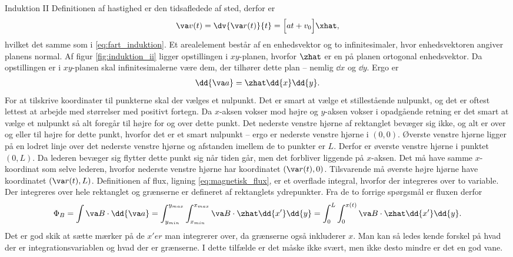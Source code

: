 \begin{opgave}{Induktion II}
    \opg Definitionen af hastighed er den tidsafledede af sted, derfor er
    \begin{align}
        \va v(t) = \dv{\va r(t)}{t} = \Big[at+v_0\Big]\xhat,
    \end{align}
    hvilket det samme som i \eqref{eq:fart_induktion}.
    \opg Et arealelement består af en enhedsvektor og to infinitesimaler, hvor enhedsvektoren angiver planens normal. Af figur \ref{fig:induktion_ii} ligger opstillingen i $xy$-planen, hvorfor $\zhat$ er en på planen ortogonal enhedsvektor. Da opstillingen er i $xy$-planen skal infinitesimalerne være dem, der tilhører dette plan -- nemlig $\dd x$ og $\dd y$. Ergo er
    \begin{align}
        \dd{\va a} = \zhat \dd{x}\dd{y}.
    \end{align}
    \opg For at tilskrive koordinater til punkterne skal der vælges et nulpunkt. Det er smart at vælge et stillestående nulpunkt, og det er oftest lettest at arbejde med størrelser med positivt fortegn. Da $x$-aksen vokser mod højre og $y$-aksen vokser i opadgående retning er det smart at vælge et nulpunkt så alt foregår til højre for og over dette punkt. Det nederste venstre hjørne af rektanglet bevæger sig ikke, og alt er over og eller til højre for dette punkt, hvorfor det er et smart nulpunkt -- ergo er nederste venstre hjørne i $(0,0)$. Øverste venstre hjørne ligger på en lodret linje over det nederste venstre hjørne og afstanden imellem de to punkter er $L$. Derfor er øverste venstre hjørne i punktet $(0,L)$. Da lederen bevæger sig flytter dette punkt sig når tiden går, men det forbliver liggende på $x$-aksen. Det må have samme $x$-koordinat som selve lederen, hvorfor nederste venstre hjørne har koordinatet $\left(\va r(t),0\right)$. Tilsvarende må øverste højre hjørne have koordinatet $\left(\va r(t),L\right)$.
    \opg Definitionen af flux, ligning \eqref{eq:magnetisk_flux}, er et overflade integral, hvorfor der integreres over to variable. Der integreres over hele rektanglet og grænserne er defineret af rektanglets ydrepunkter. Fra de to forrige spørgsmål er fluxen derfor
    \begin{align}
        \Phi_B = \int \va B \cdot \dd{\va a} = \int_{y_{min}}^{y_{max}} \int_{x_{min}}^{x_{max}} \va B \cdot \zhat \dd{x'}\dd{y} = \int_0^L \int_0^{x(t)} \va B \cdot \zhat \dd{x'}\dd{y}.
    \end{align}
    Det er god skik at sætte mærker på de $x'er$ man integrerer over, da grænserne også inkluderer $x$. Man kan så ledes kende forskel på hvad der er integrationsvariablen og hvad der er grænserne. I dette tilfælde er det måske ikke svært, men ikke desto mindre er det en god vane.

\end{opgave}

